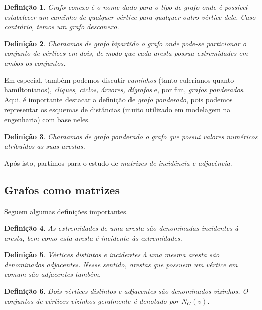 \documentclass[a4paper,12pt]{article}
\newtheorem{definicao}{Definição}[section]
\begin{document}
\begin{definicao}
	\textit{Grafo conexo} é o nome dado para o tipo de grafo onde é possível estabelecer um caminho de qualquer vértice para qualquer outro vértice dele. Caso contrário, temos um \textit{grafo desconexo}.
\end{definicao}

\begin{definicao}
	Chamamos de \textit{grafo bipartido} o grafo onde pode-se particionar o conjunto de vértices em dois, de modo que cada aresta possua extremidades em ambos os conjuntos.
\end{definicao}

Em especial, também podemos discutir \textit{caminhos} (tanto eulerianos quanto hamiltonianos), \textit{cliques, ciclos, árvores, dígrafos} e, por fim, \textit{grafos ponderados}. Aqui, é importante destacar a definição de \textit{grafo ponderado}, pois podemos representar os esquemas de distâncias (muito utilizado em modelagem na engenharia) com base neles.

\begin{definicao}
	Chamamos de \textit{grafo ponderado} o grafo que possui valores numéricos atribuídos as suas arestas.
\end{definicao}

Após isto, partimos para o estudo de \textit{matrizes de incidência e adjacência}. 

\subsection{Grafos como matrizes}

Seguem algumas definições importantes.

\begin{definicao}
	As extremidades de uma aresta são denominadas \textit{incidentes} à aresta, bem como esta aresta é \textit{incidente} às \textit{extremidades}.
\end{definicao}

\begin{definicao}
	Vértices distintos e incidentes à uma mesma aresta são denominados \textit{adjacentes}. Nesse sentido, arestas que possuem um vértice em comum são \textit{adjacentes} também.
\end{definicao}

\begin{definicao}
	Dois vértices distintos e adjacentes são denominados \textit{vizinhos}. O conjuntos de vértices \textit{vizinhos} geralmente é denotado por $N_{G}(v)$.
\end{definicao}
\end{document}
